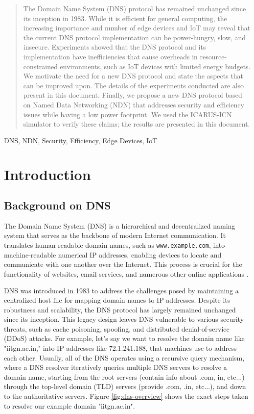 \documentclass[conference]{IEEEtran}
\begin{document}
\begin{abstract}
The Domain Name System (DNS) protocol has remained unchanged since its inception in 1983. While it is efficient for general computing, the increasing importance and number of edge devices and IoT may reveal that the current DNS protocol implementation can be power-hungry, slow, and insecure. Experiments showed that the DNS protocol and its implementation have inefficiencies that cause overheads in resource-constrained environments, such as IoT devices with limited energy budgets. We motivate the need for a new DNS protocol and state the aspects that can be improved upon. The details of the experiments conducted are also present in this document. Finally, we propose a new DNS protocol based on Named Data Networking (NDN) that addresses security and efficiency issues while having a low power footprint. We used the ICARUS-ICN simulator to verify these claims; the results are presented in this document.
\end{abstract}

\begin{IEEEkeywords}
DNS, NDN, Security, Efficiency, Edge Devices, IoT
\end{IEEEkeywords}

\section{Introduction}
\subsection{Background on DNS}
The Domain Name System (DNS) is a hierarchical and decentralized naming system that serves as the backbone of modern Internet communication. It translates human-readable domain names, such as \texttt{www.example.com}, into machine-readable numerical IP addresses, enabling devices to locate and communicate with one another over the Internet. This process is crucial for the functionality of websites, email services, and numerous other online applications \cite{mockapetris1983dns}.

DNS was introduced in 1983 to address the challenges posed by maintaining a centralized host file for mapping domain names to IP addresses. Despite its robustness and scalability, the DNS protocol has largely remained unchanged since its inception. This legacy design leaves DNS vulnerable to various security threats, such as cache poisoning, spoofing, and distributed denial-of-service (DDoS) attacks. For example, let's say we want to resolve the domain name like "iitgn.ac.in," into IP addresses like 72.1.241.188, that machines use to address each other. Usually, all of the DNS operates using a recursive query mechanism, where a DNS resolver iteratively queries multiple DNS servers to resolve a domain name, starting from the root servers (contain info about .com, in, etc...) through the top-level domain (TLD) servers (provide .com, .in,  etc...), and down to the authoritative servers. Figure \ref{fig:dns-overview} shows the exact steps taken to resolve our example domain "iitgn.ac.in". 
\end{document}
